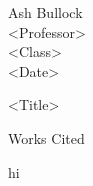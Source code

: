 \documentclass[12pt]{article}
\newcommand{\bibent}{\noindent \hangindent 40pt}
\newenvironment{workscited}{\newpage \begin{center} Works Cited \end{center}}{\newpage}
\begin{document}
\begin{flushleft}

Ash Bullock\\
<Professor>\\
<Class>\\
<Date>\\



\begin{center}
<Title>
\end{center}



\setlength{\parindent}{0.5in}

\lipsum[1]

\begin{displayquote}
    \lipsum[2]
\end{displayquote}

\lipsum[3]



\begin{workscited}

\bibent hi



\end{workscited}

\end{flushleft}
\end{document}
